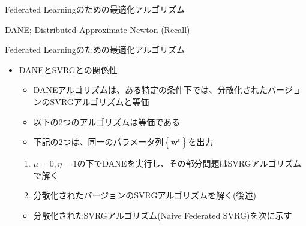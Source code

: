 \documentclass[dvipdfmx,notheorems,t]{beamer}
\begin{document}
\begin{frame}{Federated Learningのための最適化アルゴリズム}

\begin{algorithm}[H]
	\DontPrintSemicolon
	\caption{DANE; Distributed Approximate Newton (Recall) ~\cite{1610.02527}}
	\label{alg:dane-recall}
	\begin{algorithmic}[1]
		\ENDFOR
	\end{algorithmic}
\end{algorithm}

\end{frame}

\begin{frame}{Federated Learningのための最適化アルゴリズム}

\begin{itemize}
	\item DANEとSVRGとの関係性
	\begin{itemize}
		\item DANEアルゴリズムは、ある特定の条件下では、分散化されたバージョンのSVRGアルゴリズムと等価
		\newline
		
		\item 以下の2つのアルゴリズムは等価である
		\item 下記の2つは、同一のパラメータ列$\left\{ \bm{w}^t \right\}$を出力
	\end{itemize}
	
	\begin{enumerate}
		\item $\mu = 0, \eta = 1$の下でDANEを実行し、その部分問題はSVRGアルゴリズムで解く
		\item 分散化されたバージョンのSVRGアルゴリズムを解く(後述)
	\end{enumerate}
	
	\begin{itemize}
		\item 分散化されたSVRGアルゴリズム(Naive Federated SVRG)を次に示す
	\end{itemize}
\end{itemize}

\end{frame}
\end{document}
